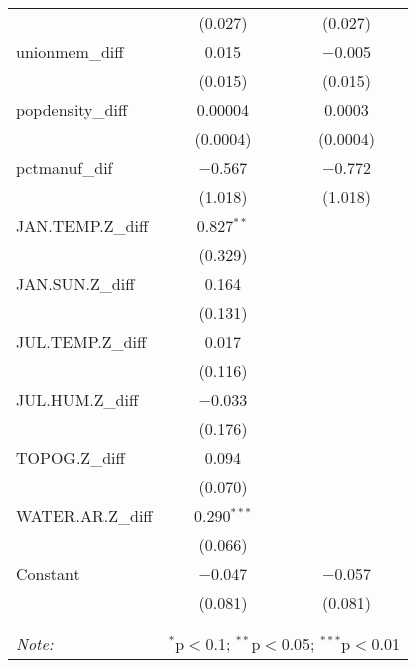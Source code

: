 \begin{table}[!htbp]
\begin{tabular}{@{\extracolsep{5pt}}lcc}
  & (0.027) & (0.027) \\ 
  unionmem\_diff & 0.015 & $-$0.005 \\ 
  & (0.015) & (0.015) \\ 
  popdensity\_diff & 0.00004 & 0.0003 \\ 
  & (0.0004) & (0.0004) \\ 
  pctmanuf\_dif & $-$0.567 & $-$0.772 \\ 
  & (1.018) & (1.018) \\ 
  JAN.TEMP.Z\_diff & 0.827$^{**}$ &  \\ 
  & (0.329) &  \\ 
  JAN.SUN.Z\_diff & 0.164 &  \\ 
  & (0.131) &  \\ 
  JUL.TEMP.Z\_diff & 0.017 &  \\ 
  & (0.116) &  \\ 
  JUL.HUM.Z\_diff & $-$0.033 &  \\ 
  & (0.176) &  \\ 
  TOPOG.Z\_diff & 0.094 &  \\ 
  & (0.070) &  \\ 
  WATER.AR.Z\_diff & 0.290$^{***}$ &  \\ 
  & (0.066) &  \\ 
  Constant & $-$0.047 & $-$0.057 \\ 
  & (0.081) & (0.081) \\ 
 \hline \\[-1.8ex] 
\hline 
\hline \\[-1.8ex] 
\textit{Note:}  & \multicolumn{2}{r}{$^{*}$p$<$0.1; $^{**}$p$<$0.05; $^{***}$p$<$0.01} \\ 
\end{tabular} 
\end{table} 
